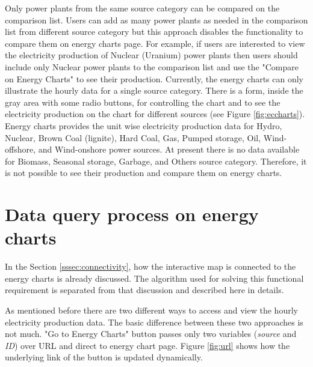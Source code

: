 Only power plants from the same source category can be compared on the comparison list. Users can add as many power plants as needed in the comparison list from different source category but this approach disables the functionality to compare them on energy charts page. For example, if users are interested to view the electricity production of Nuclear (Uranium) power plants then users should include only Nuclear power plants to the comparison list and use the "Compare on Energy Charts" to see their production. Currently, the energy charts can only illustrate the hourly data for a single source category. There is a form, inside the gray area with some radio buttons, for controlling the chart and to see the electricity production on the chart for different sources (see Figure \ref{fig:eccharts}). Energy charts provides the unit wise electricity production data for Hydro, Nuclear, Brown Coal (lignite), Hard Coal, Gas, Pumped storage, Oil, Wind-offshore, and Wind-onshore power sources. At present there is no data available for Biomass, Seasonal storage, Garbage, and Others source category. Therefore, it is not possible to see their production and compare them on energy charts.   

\section{Data query process on energy charts}
\label{sec:algorithm}

In the Section \ref{sssec:connectivity}, how the interactive map is connected to the energy charts is already discussed. The algorithm used for solving this functional requirement is separated from that discussion and described here in details. 

As mentioned before there are two different ways to access and view the hourly electricity production data. The basic difference between these two approaches is not much. "Go to Energy Charts" button passes only two variables (\textit{source} and \textit{ID}) over URL and direct to energy chart page. Figure \ref{fig:url} shows how the underlying link of the button is updated dynamically. 

